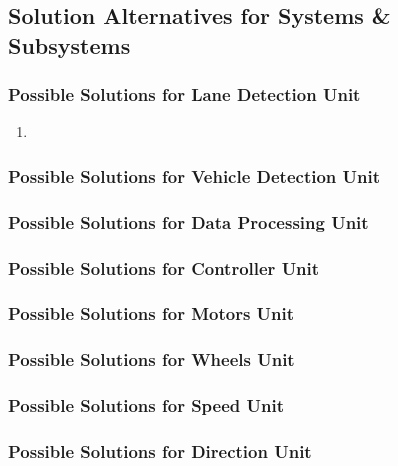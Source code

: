 \documentclass[a4paper,12pt]{article}
\begin{document}
	\subsection{Solution Alternatives for Systems \& Subsystems }
	
	\subsubsection{Possible Solutions for Lane Detection Unit}		
	
	\begin{enumerate}
		\item 
		
	\end{enumerate}

	\subsubsection{Possible Solutions for Vehicle Detection Unit}			
		
	\subsubsection{Possible Solutions for Data Processing Unit}			
	
	\subsubsection{Possible Solutions for Controller Unit}			

	\subsubsection{Possible Solutions for Motors Unit}	
	
	\subsubsection{Possible Solutions for Wheels Unit}
	
	\subsubsection{Possible Solutions for Speed Unit}
	
	\subsubsection{Possible Solutions for Direction Unit}			
				
				
			
\end{document}
